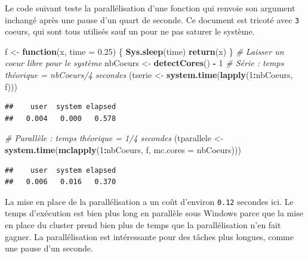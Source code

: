 \documentclass[
  12pt,
  french,
  a4paper,
  extrafontsizes,onecolumn,openright
  ]{memoir}
\newenvironment{Shaded}{\begin{snugshade}}{\end{snugshade}}
\newcommand{\CommentTok}[1]{\textcolor[rgb]{0.56,0.35,0.01}{\textit{#1}}}
\newcommand{\ControlFlowTok}[1]{\textcolor[rgb]{0.13,0.29,0.53}{\textbf{#1}}}
\newcommand{\DataTypeTok}[1]{\textcolor[rgb]{0.13,0.29,0.53}{#1}}
\newcommand{\DecValTok}[1]{\textcolor[rgb]{0.00,0.00,0.81}{#1}}
\newcommand{\FloatTok}[1]{\textcolor[rgb]{0.00,0.00,0.81}{#1}}
\newcommand{\KeywordTok}[1]{\textcolor[rgb]{0.13,0.29,0.53}{\textbf{#1}}}
\newcommand{\NormalTok}[1]{#1}
\newcommand{\OperatorTok}[1]{\textcolor[rgb]{0.81,0.36,0.00}{\textbf{#1}}}
\newcommand{\StringTok}[1]{\textcolor[rgb]{0.31,0.60,0.02}{#1}}
\begin{document}
\normalsize

Le code suivant teste la parallélisation d'une fonction qui renvoie son argument inchangé après une pause d'un quart de seconde.
Ce document est tricoté avec \texttt{3} coeurs, qui sont tous utilisés sauf un pour ne pas saturer le système.

\scriptsize

\begin{Shaded}
\begin{Highlighting}[]
\NormalTok{f <-}\StringTok{ }\ControlFlowTok{function}\NormalTok{(x, }\DataTypeTok{time =} \FloatTok{0.25}\NormalTok{) \{}
    \KeywordTok{Sys.sleep}\NormalTok{(time)}
    \KeywordTok{return}\NormalTok{(x)}
\NormalTok{\}}
\CommentTok{# Laisser un coeur libre pour le système}
\NormalTok{nbCoeurs <-}\StringTok{ }\KeywordTok{detectCores}\NormalTok{() }\OperatorTok{-}\StringTok{ }\DecValTok{1}
\CommentTok{# Série : temps théorique = nbCoeurs/4 secondes}
\NormalTok{(tserie <-}\StringTok{ }\KeywordTok{system.time}\NormalTok{(}\KeywordTok{lapply}\NormalTok{(}\DecValTok{1}\OperatorTok{:}\NormalTok{nbCoeurs, f)))}
\end{Highlighting}
\end{Shaded}

\begin{verbatim}
##    user  system elapsed 
##   0.004   0.000   0.578
\end{verbatim}

\begin{Shaded}
\begin{Highlighting}[]
\CommentTok{# Parallèle : temps théorique = 1/4 secondes}
\NormalTok{(tparallele <-}\StringTok{ }\KeywordTok{system.time}\NormalTok{(}\KeywordTok{mclapply}\NormalTok{(}\DecValTok{1}\OperatorTok{:}\NormalTok{nbCoeurs, f, }\DataTypeTok{mc.cores =}\NormalTok{ nbCoeurs)))}
\end{Highlighting}
\end{Shaded}

\begin{verbatim}
##    user  system elapsed 
##   0.006   0.016   0.370
\end{verbatim}

\normalsize

La mise en place de la parallélisation a un coût d'environ \texttt{0.12} secondes ici.
Le temps d'exécution est bien plus long en parallèle sous Windows parce que la mise en place du cluster prend bien plus de temps que la parallélisation n'en fait gagner.
La parallélisation est intéressante pour des tâches plus longues, comme une pause d'un seconde.
\end{document}
